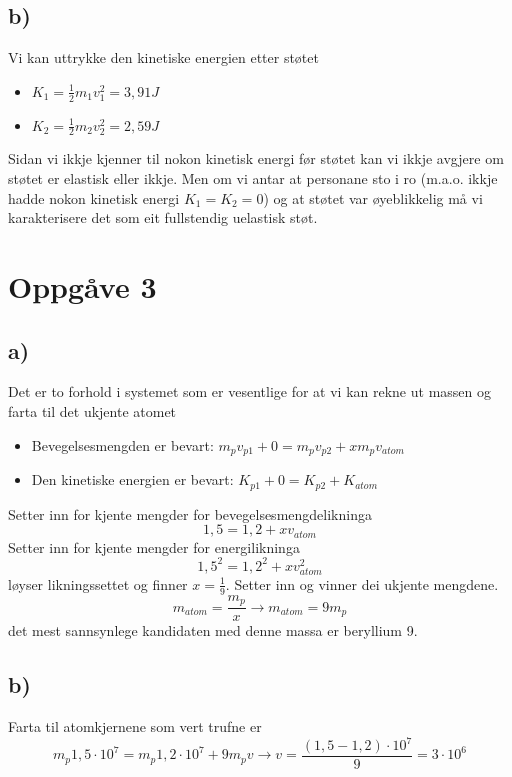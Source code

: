 \documentclass[12pt,a4paper]{article}
\begin{document}
    \subsection*{b)}
    Vi kan uttrykke den kinetiske energien etter støtet
    \begin{itemize}
      \item $K_1 = \frac{1}{2}m_1v_1^2 = 3,91J$
      \item $K_2 = \frac{1}{2}m_2v_2^2 = 2,59J$
    \end{itemize}
    Sidan vi ikkje kjenner til nokon kinetisk energi før støtet kan vi ikkje
    avgjere om støtet er elastisk eller ikkje. Men om vi antar at personane sto
    i ro (m.a.o. ikkje hadde nokon kinetisk energi $K_1 = K_2 = 0$) og at
    støtet var øyeblikkelig må vi karakterisere det som eit fullstendig uelastisk støt.

  \section*{Oppgåve 3}
    \subsection*{a)}
    Det er to forhold i systemet som er vesentlige for at vi kan rekne ut massen og farta
    til det ukjente atomet
    \begin{itemize}
      \item Bevegelsesmengden er bevart: $m_pv_{p1} + 0 = m_pv_{p2} + xm_pv_{atom}$
      \item Den kinetiske energien er bevart: $K_{p1} + 0 = K_{p2} + K_{atom}$
    \end{itemize}
    Setter inn for kjente mengder for bevegelsesmengdelikninga
    \begin{equation}
      1,5 = 1,2 + xv_{atom}
    \end{equation}
    Setter inn for kjente mengder for energilikninga
    \begin{equation}
      1,5^2 = 1,2^2 + xv_{atom}^2
    \end{equation}
    løyser likningssettet og finner $x = \frac{1}{9}$. Setter inn og vinner dei ukjente
    mengdene.
    \begin{equation}
      m_{atom} = \frac{m_p}{x} \rightarrow m_{atom} = 9m_p
    \end{equation}
    det mest sannsynlege kandidaten med denne massa er beryllium 9.

    \subsection*{b)}
    Farta til atomkjernene som vert trufne er 
    \begin{equation}
      m_p1,5\cdot10^7 = m_p1,2\cdot 10^7 + 9m_pv \rightarrow 
      v = \frac{(1,5-1,2)\cdot10^7}{9} = 3\cdot 10^6
    \end{equation}
\end{document}

